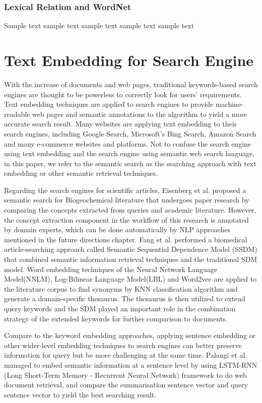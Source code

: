 \subsubsection{Lexical Relation and WordNet}
Sample text sample text sample text sample text sample text


\section{Text Embedding for Search Engine}
With the increase of documents and web pages, traditional keywords-based search engines are thought to be powerless to correctly look for users' requirements.
Text embedding techniques are applied to search engines to provide machine-readable web pages and semantic annotations to the algorithm to yield a more accurate search result.
Many websites are applying text embedding to their search engines, including Google Search, Microsoft's Bing Search, Amazon Search and many e-commerce websites and platforms.
Not to confuse the search engine using text embedding and the search engine using semantic web search language, in this paper, we refer to the semantic search as the searching approach with text embedding or other semantic retrieval techniques. 

Regarding the search engines for scientific articles, Eisenberg et al.\cite{eisenberg2017} proposed a semantic search for Biogeochemical literature that undergoes paper research by comparing the concepts extracted from queries and academic literature.
However, the concept extraction component in the workflow of this research is annotated by domain experts, which can be done automatically by NLP approaches mentioned in the future directions chapter.
Fang et al.\cite{fang2018} performed a biomedical article-searching approach called Semantic Sequential Dependence Model (SSDM) that combined semantic information retrieval techniques and the traditional SDM model.
Word embedding techniques of the Neural Network Language Model(NNLM)\cite{bengio2000}, Log-Bilinear Language Model(LBL)\cite{mnih2007} and Word2vec are applied to the literature corpus to find synonyms by KNN classification algorithm and generate a domain-specific thesaurus.
The thesaurus is then utilized to extend query keywords and the SDM played an important role in the combination strategy of the extended keywords for further comparison to documents.

Compare to the keyword embedding approaches, applying sentence embedding or other wider-level embedding techniques to search engines can better preserve information for query but be more challenging at the same time.
Palangi et al.\cite{palangi2016} managed to embed semantic information at a sentence level by using LSTM-RNN (Long Short-Term Memory - Recurrent Neural Network) framework to do web document retrieval, and compare the summarisation sentence vector and query sentence vector to yield the best searching result.



